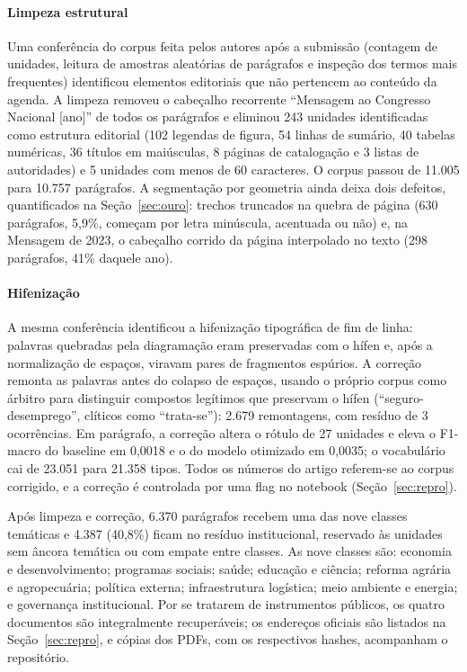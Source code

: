 \documentclass[fleqn,10pt]{SelfArx}
\begin{document}
\paragraph{Limpeza estrutural} Uma conferência do corpus feita pelos autores após a submissão (contagem de unidades, leitura de amostras aleatórias de parágrafos e inspeção dos termos mais frequentes) identificou elementos editoriais que não pertencem ao conteúdo da agenda. A limpeza removeu o cabeçalho recorrente ``Mensagem ao Congresso Nacional [ano]'' de todos os parágrafos e eliminou 243 unidades identificadas como estrutura editorial (102 legendas de figura, 54 linhas de sumário, 40 tabelas numéricas, 36 títulos em maiúsculas, 8 páginas de catalogação e 3 listas de autoridades) e 5 unidades com menos de 60 caracteres. O corpus passou de 11.005 para 10.757 parágrafos. A segmentação por geometria ainda deixa dois defeitos, quantificados na Seção~\ref{sec:ouro}: trechos truncados na quebra de página (630 parágrafos, 5,9\%, começam por letra minúscula, acentuada ou não) e, na Mensagem de 2023, o cabeçalho corrido da página interpolado no texto (298 parágrafos, 41\% daquele ano).

\paragraph{Hifenização} A mesma conferência identificou a hifenização tipográfica de fim de linha: palavras quebradas pela diagramação eram preservadas com o hífen e, após a normalização de espaços, viravam pares de fragmentos espúrios. A correção remonta as palavras antes do colapso de espaços, usando o próprio corpus como árbitro para distinguir compostos legítimos que preservam o hífen (``seguro-desemprego'', clíticos como ``trata-se''): 2.679 remontagens, com resíduo de 3 ocorrências. Em parágrafo, a correção altera o rótulo de 27 unidades e eleva o F1-macro do baseline em 0,0018 e o do modelo otimizado em 0,0035; o vocabulário cai de 23.051 para 21.358 tipos. Todos os números do artigo referem-se ao corpus corrigido, e a correção é controlada por uma flag no notebook (Seção~\ref{sec:repro}).

Após limpeza e correção, 6.370 parágrafos recebem uma das nove classes temáticas e 4.387 (40,8\%) ficam no resíduo institucional, reservado às unidades sem âncora temática ou com empate entre classes. As nove classes são: economia e desenvolvimento; programas sociais; saúde; educação e ciência; reforma agrária e agropecuária; política externa; infraestrutura logística; meio ambiente e energia; e governança institucional. Por se tratarem de instrumentos públicos, os quatro documentos são integralmente recuperáveis; os endereços oficiais são listados na Seção~\ref{sec:repro}, e cópias dos PDFs, com os respectivos hashes, acompanham o repositório.
\end{document}
